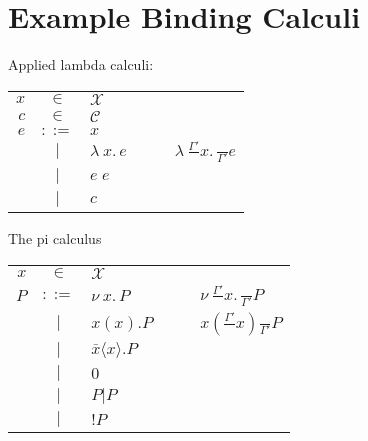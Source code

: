 \documentclass[11pt]{article} %
\theoremstyle{definition}
\newcommand{\fn}{\lambda\:\!}
\begin{document}
\section{Example Binding Calculi}

Applied lambda calculi:
\newline
\begin{tabular}{rclcl}
$x$ & $\in$ & $\mathcal{X}$ \\
$c$ & $\in$ & $\mathcal{C}$ &$\quad$& \\
$e$ & $::=$ & $x$ &&  \\
& $\mid$ & $\fn x.\,e$ && $\fn \frac{\Gamma'}{}x.\, \frac{}{\Gamma'}e$ \\
& $\mid$ & $e\;e$ &&  \\
& $\mid$ & $c$ &&  \\
\end{tabular}

The pi calculus
\newline
\begin{tabular}{rclcl}
$x$ & $\in$ & $\mathcal{X}$ &$\quad$& \\
$P$ & $::=$ & $\nu\:\!x.\,P$
    && $\nu\:\!\frac{\Gamma'}{}x.\,\frac{}{\Gamma'}P$ \\
& $\mid$ & $x(x).P$
    && $x(\frac{\Gamma'}{}x)\frac{}{\Gamma'}P$ \\
& $\mid$ & $\bar x\langle x \rangle.P$ \\
& $\mid$ & $0$ \\
& $\mid$ & $P | P$ \\
& $\mid$ & $!P$ 
\end{tabular}
\end{document}
